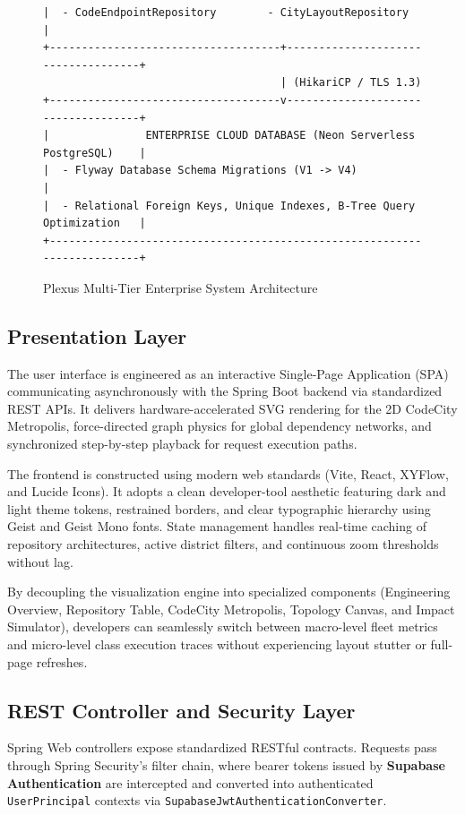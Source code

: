 \documentclass[11pt,a4paper,openany]{report}
\begin{document}
\begin{figure}[htbp]
\begin{lstlisting}[style=asciistyle, rulecolor=\color{primary}]
|  - CodeEndpointRepository        - CityLayoutRepository                 |
+------------------------------------+------------------------------------+
                                     | (HikariCP / TLS 1.3)
+------------------------------------v------------------------------------+
|               ENTERPRISE CLOUD DATABASE (Neon Serverless PostgreSQL)    |
|  - Flyway Database Schema Migrations (V1 -> V4)                         |
|  - Relational Foreign Keys, Unique Indexes, B-Tree Query Optimization   |
+-------------------------------------------------------------------------+
\end{lstlisting}
\caption{Plexus Multi-Tier Enterprise System Architecture}
\label{fig:arch-diagram}
\end{figure}

\subsection{Presentation Layer}
The user interface is engineered as an interactive Single-Page Application (SPA) communicating asynchronously with the Spring Boot backend via standardized REST APIs. It delivers hardware-accelerated SVG rendering for the 2D CodeCity Metropolis, force-directed graph physics for global dependency networks, and synchronized step-by-step playback for request execution paths.

The frontend is constructed using modern web standards (Vite, React, XYFlow, and Lucide Icons). It adopts a clean developer-tool aesthetic featuring dark and light theme tokens, restrained borders, and clear typographic hierarchy using Geist and Geist Mono fonts. State management handles real-time caching of repository architectures, active district filters, and continuous zoom thresholds without lag.

By decoupling the visualization engine into specialized components (Engineering Overview, Repository Table, CodeCity Metropolis, Topology Canvas, and Impact Simulator), developers can seamlessly switch between macro-level fleet metrics and micro-level class execution traces without experiencing layout stutter or full-page refreshes.

\subsection{REST Controller and Security Layer}
Spring Web controllers expose standardized RESTful contracts. Requests pass through Spring Security's filter chain, where bearer tokens issued by \textbf{Supabase Authentication} are intercepted and converted into authenticated \texttt{UserPrincipal} contexts via \texttt{SupabaseJwtAuthenticationConverter}.
\end{document}
